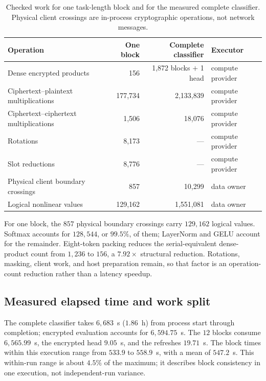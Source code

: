 \begin{table}[!t]\centering\small
\caption{Checked work for one task-length block and for the measured complete classifier. Physical
client crossings are in-process cryptographic operations, not network messages.}
\label{tab:cost}
\begin{tabularx}{\textwidth}{Y r r l}
\toprule
Operation & One block & Complete classifier & Executor \\
\midrule
Dense encrypted products & 156 & 1{,}872 blocks $+$ 1 head & compute provider \\
Ciphertext--plaintext multiplications & 177{,}734 & 2{,}133{,}839 & compute provider \\
Ciphertext--ciphertext multiplications & 1{,}506 & 18{,}076 & compute provider \\
Rotations & 8{,}173 & --- & compute provider \\
Slot reductions & 8{,}776 & --- & compute provider \\
Physical client boundary crossings & 857 & 10{,}299 & data owner \\
Logical nonlinear values & 129{,}162 & 1{,}551{,}081 & data owner \\
\bottomrule
\end{tabularx}
\end{table}

For one block, the $857$ physical boundary crossings carry $129{,}162$ logical values. Softmax
accounts for $128{,}544$, or $99.5\%$, of them; LayerNorm and GELU account for the remainder.
Eight-token packing reduces the serial-equivalent dense-product count from $1{,}236$ to $156$, a
$7.92\times$ structural reduction. Rotations, masking, client work, and host preparation remain,
so that factor is an operation-count reduction rather than a latency speedup.

\subsection{Measured elapsed time and work split}

The complete classifier takes $6{,}683$~s ($1.86$~h) from process start through completion;
encrypted evaluation accounts for $6{,}594.75$~s. The $12$ blocks consume $6{,}565.99$~s, the
encrypted head $9.05$~s, and the refreshes $19.71$~s. The block times within this execution range
from $533.9$ to $558.9$~s, with a mean of $547.2$~s. This within-run range is about
$4.5\%$ of the maximum; it describes block consistency in one execution, not independent-run
variance.


